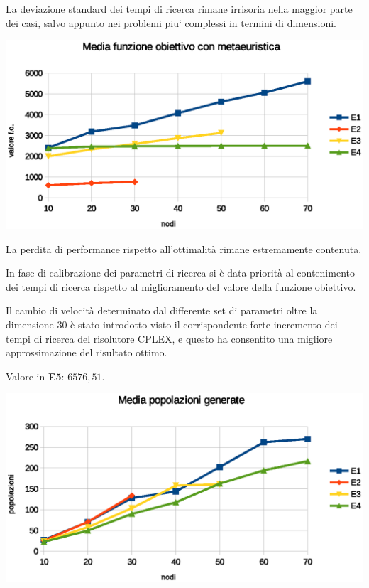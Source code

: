 \documentclass[a4paper]{article}
\begin{document}
                    La deviazione standard dei tempi di ricerca rimane irrisoria nella maggior parte dei casi, salvo appunto nei problemi piu` complessi in termini di dimensioni.

                    \includegraphics[scale=0.7]{img/gavgobj}

                    La perdita di performance rispetto all'ottimalit\`a rimane estremamente contenuta.

                    In fase di calibrazione dei parametri di ricerca si \`e data priorit\`a al contenimento dei tempi di ricerca rispetto al miglioramento del valore della funzione obiettivo.

                    Il cambio di velocit\`a determinato dal differente set di parametri oltre la dimensione 30 \`e stato introdotto visto il corrispondente forte incremento dei tempi di ricerca del
                    risolutore CPLEX, e questo ha consentito una migliore approssimazione del risultato ottimo.

                    Valore in \textbf{E5}: $6576,51$.

                    \includegraphics[scale=0.7]{img/popavg}
\end{document}
